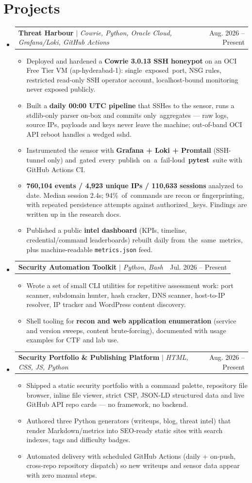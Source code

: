 \documentclass[letterpaper,11pt]{article}
\makeatletter
\newcommand{\resumeItem}[1]{
  \item\small{
    {#1\vspace{-2pt}}
  }
}
\newcommand{\resumeProjectHeading}[2]{
    \item
    \begin{tabular*}{\linewidth}{l@{\extracolsep{\fill}}r}
      \small#1 & #2 \\
    \end{tabular*}\vspace{-7pt}
}
\newcommand{\resumeSubHeadingListStart}{\begin{itemize}[leftmargin=0.15in, label={}]}
\newcommand{\resumeSubHeadingListEnd}{\end{itemize}}
\newcommand{\resumeItemListStart}{\begin{itemize}}
\newcommand{\resumeItemListEnd}{\end{itemize}\vspace{-5pt}}
\makeatother
\begin{document}
\section{Projects}
    \resumeSubHeadingListStart
      \resumeProjectHeading
          {\textbf{Threat Harbour} $|$ \emph{Cowrie, Python, Oracle Cloud, Grafana/Loki, GitHub Actions}}{Aug. 2026 -- Present}
          \resumeItemListStart
            \resumeItem{Deployed and hardened a \textbf{Cowrie 3.0.13 SSH honeypot} on an OCI Free Tier VM (ap-hyderabad-1): single~exposed~port, NSG rules, restricted read-only SSH operator account, localhost-bound monitoring never exposed publicly.}
            \resumeItem{Built a \textbf{daily 00:00 UTC pipeline} that SSHes to the sensor, runs a stdlib-only parser on-box and commits \mbox{only aggregates} --- raw logs, source IPs, payloads and keys never leave the machine; out-of-band OCI API reboot handles a wedged sshd.}
            \resumeItem{Instrumented the sensor with \textbf{Grafana + Loki + Promtail} (SSH-tunnel only) \mbox{and gated every publish on a fail-loud \textbf{pytest} suite} with GitHub Actions CI.}
            \resumeItem{\textbf{760,104 events / 4,923 unique IPs / 110,633 sessions} analyzed to date. Median session 2.4s; 94\%~of~commands are recon or fingerprinting, with repeated persistence attempts against authorized\_keys. Findings are written up in the research docs.}
            \resumeItem{Published a public \textbf{intel dashboard} (KPIs, timeline, credential/command leaderboards) rebuilt daily \mbox{from the same metrics}, plus machine-readable \texttt{metrics.json} feed.}
          \resumeItemListEnd
      \resumeProjectHeading
          {\textbf{Security Automation Toolkit} $|$ \emph{Python, Bash}}{Jul. 2026 -- Present}
          \resumeItemListStart
            \resumeItem{Wrote a set of small CLI utilities for repetitive assessment work: port scanner, subdomain hunter, hash cracker, DNS scanner, host-to-IP resolver, IP tracker and WordPress content discovery.}
            \resumeItem{Shell tooling for \textbf{recon and web application enumeration} (service and version sweeps, content brute-forcing), documented with usage examples for CTF and lab use.}
          \resumeItemListEnd
      \resumeProjectHeading
          {\textbf{Security Portfolio \& Publishing Platform} $|$ \emph{HTML, CSS, JS, Python}}{Aug. 2026 -- Present}
          \resumeItemListStart
            \resumeItem{Shipped a static security portfolio with a command palette, repository file browser, inline file viewer, strict CSP, JSON-LD structured data and live GitHub API repo cards --- no framework, no backend.}
            \resumeItem{Authored three Python generators (writeups, blog, threat intel) that render Markdown/metrics into SEO-ready static sites with search indexes, tags and difficulty badges.}
            \resumeItem{Automated delivery with scheduled GitHub Actions (daily + on-push, cross-repo repository dispatch) so new writeups and sensor data appear with zero manual steps.}
          \resumeItemListEnd
    \resumeSubHeadingListEnd
\end{document}

